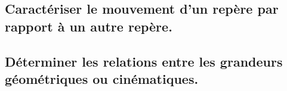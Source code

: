 \documentclass[10pt,fleqn]{book}
\newcommand{\repRel}{../..}
\newcommand{\repStyle}{\repRel/Style}
\newcommand{\td}{fichier_td}
\newcommand{\repExos}{\repRel/ExercicesCompetences}
\newcommand{\repExo}{dossier}
\begin{document}
\renewcommand{\repExo}{\repExos/C2_MettreEnOeuvreDemarche/C2_04_Correcteurs/65_Eclipse_03}
\renewcommand{\td}{65_Eclipse_03}
\graphicspath{{\repStyle/png/}{\repExo/images/}}


\renewcommand{\repExo}{\repExos/C2_MettreEnOeuvreDemarche/C2_04_Correcteurs/66_Micromanipulateur}
\renewcommand{\td}{66_Micromanipulateur}
\graphicspath{{\repStyle/png/}{\repExo/images/}}


\renewcommand{\repExo}{\repExos/C2_MettreEnOeuvreDemarche/C2_04_Correcteurs/67_PompeTurbo}
\renewcommand{\td}{67_PompeTurbo}
\graphicspath{{\repStyle/png/}{\repExo/images/}}


\renewcommand{\repExo}{\repExos/C2_MettreEnOeuvreDemarche/C2_04_Correcteurs/68_Roburoc}
\renewcommand{\td}{68_Roburoc}
\graphicspath{{\repStyle/png/}{\repExo/images/}}


\renewcommand{\repExo}{\repExos/C2_MettreEnOeuvreDemarche/C2_04_Correcteurs/70_Hublex}
\renewcommand{\td}{70_Hublex}
\graphicspath{{\repStyle/png/}{\repExo/images/}}


\subsection{Caractériser le mouvement d’un repère par rapport à un autre repère.} 

\subsection{Déterminer les relations entre les grandeurs géométriques ou cinématiques. } 

\renewcommand{\repExo}{\repExos/C2_MettreEnOeuvreDemarche/C2_06_DeterminerLoisES/10_PompePalette}
\renewcommand{\td}{10_PompePalette}
\graphicspath{{\repStyle/png/}{\repExo/images/}}


\renewcommand{\repExo}{\repExos/C2_MettreEnOeuvreDemarche/C2_06_DeterminerLoisES/11_PompePistonsRadiaux}
\renewcommand{\td}{11_PompePistonsRadiaux}
\graphicspath{{\repStyle/png/}{\repExo/images/}}


\renewcommand{\repExo}{\repExos/C2_MettreEnOeuvreDemarche/C2_06_DeterminerLoisES/12_BielleManivelle}
\renewcommand{\td}{12_BielleManivelle}
\graphicspath{{\repStyle/png/}{\repExo/images/}}


\renewcommand{\repExo}{\repExos/C2_MettreEnOeuvreDemarche/C2_06_DeterminerLoisES/13_TransfoMouvement}
\renewcommand{\td}{13_TransfoMouvement}
\graphicspath{{\repStyle/png/}{\repExo/images/}}

\end{document}
